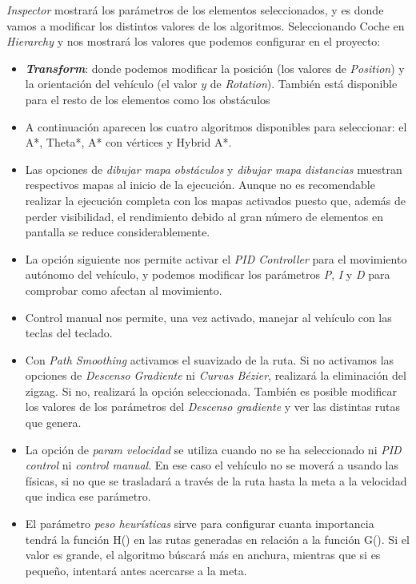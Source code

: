 \textit{Inspector} mostrará los parámetros de los elementos seleccionados, y es donde vamos a modificar los distintos valores de los algoritmos. Seleccionando Coche en \textit{Hierarchy} y nos mostrará los valores que podemos configurar en el proyecto:
\begin{itemize}
\item \textbf{\textit{Transform}}: donde podemos modificar la posición (los valores de \textit{Position}) y la orientación del vehículo (el valor $y$ de \textit{Rotation}). También está disponible para el resto de los elementos como los obstáculos
\item A continuación aparecen los cuatro algoritmos disponibles para seleccionar: el A*, Theta*, A* con vértices y Hybrid A*.
\item Las opciones de \textit{dibujar mapa obstáculos} y \textit{dibujar mapa distancias} muestran respectivos mapas al inicio de la ejecución. Aunque no es recomendable realizar la ejecución completa con los mapas activados puesto que, además de perder visibilidad, el rendimiento debido al gran número de elementos en pantalla se reduce considerablemente.
\item La opción siguiente nos permite activar el \textit{PID Controller} para el movimiento autónomo del vehículo, y podemos modificar los parámetros \textit{P}, \textit{I} y \textit{D} para comprobar como afectan al movimiento.
\item Control manual nos permite, una vez activado, manejar al vehículo con las teclas del teclado.
\item Con \textit{Path Smoothing} activamos el suavizado de la ruta. Si no activamos las opciones de \textit{Descenso Gradiente} ni \textit{Curvas Bézier}, realizará la eliminación del zigzag. Si no, realizará la opción seleccionada. También es posible modificar los valores de los parámetros del \textit{Descenso gradiente} y ver las distintas rutas que genera.
\item La opción de \textit{param velocidad} se utiliza cuando no se ha seleccionado ni \textit{PID control} ni \textit{control manual}. En ese caso el vehículo no se moverá a usando las físicas, si no que se trasladará a través de la ruta hasta la meta a la velocidad que indica ese parámetro.
\item El parámetro \textit{peso heurísticas} sirve para configurar cuanta importancia tendrá la función H() en las rutas generadas en relación a la función G(). Si el valor es grande, el algoritmo búscará más en anchura, mientras que si es pequeño, intentará antes acercarse a la meta.
\end{itemize}

